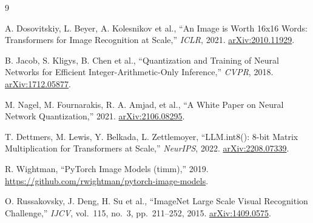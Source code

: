 \documentclass[12pt,a4paper]{article}
\begin{document}
\begin{thebibliography}{9}

A. Dosovitskiy, L. Beyer, A. Kolesnikov et al.,
``An Image is Worth 16x16 Words: Transformers for Image Recognition at Scale,''
\emph{ICLR}, 2021. \href{https://arxiv.org/abs/2010.11929}{arXiv:2010.11929}.

B. Jacob, S. Kligys, B. Chen et al.,
``Quantization and Training of Neural Networks for Efficient
Integer-Arithmetic-Only Inference,''
\emph{CVPR}, 2018. \href{https://arxiv.org/abs/1712.05877}{arXiv:1712.05877}.

M. Nagel, M. Fournarakis, R. A. Amjad, et al.,
``A White Paper on Neural Network Quantization,''
2021. \href{https://arxiv.org/abs/2106.08295}{arXiv:2106.08295}.

T. Dettmers, M. Lewis, Y. Belkada, L. Zettlemoyer,
``LLM.int8(): 8-bit Matrix Multiplication for Transformers at Scale,''
\emph{NeurIPS}, 2022. \href{https://arxiv.org/abs/2208.07339}{arXiv:2208.07339}.

R. Wightman, ``PyTorch Image Models (timm),'' 2019.
\url{https://github.com/rwightman/pytorch-image-models}.

O. Russakovsky, J. Deng, H. Su et al.,
``ImageNet Large Scale Visual Recognition Challenge,''
\emph{IJCV}, vol.~115, no.~3, pp.~211--252, 2015.
\href{https://arxiv.org/abs/1409.0575}{arXiv:1409.0575}.

\end{thebibliography}
\end{document}
